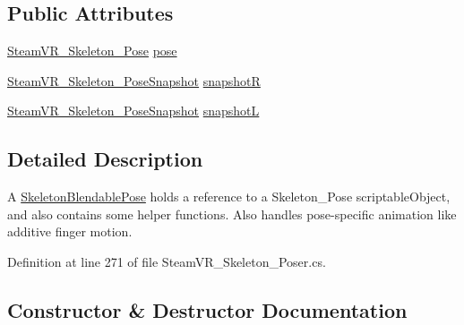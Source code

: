 \subsection*{Public Attributes}
\begin{DoxyCompactItemize}
\item 
\mbox{\hyperlink{class_valve_1_1_v_r_1_1_steam_v_r___skeleton___pose}{Steam\+V\+R\+\_\+\+Skeleton\+\_\+\+Pose}} \mbox{\hyperlink{class_valve_1_1_v_r_1_1_steam_v_r___skeleton___poser_1_1_skeleton_blendable_pose_afe000b0d0e4e73ed4d18eb3d9195e30b}{pose}}
\item 
\mbox{\hyperlink{class_valve_1_1_v_r_1_1_steam_v_r___skeleton___pose_snapshot}{Steam\+V\+R\+\_\+\+Skeleton\+\_\+\+Pose\+Snapshot}} \mbox{\hyperlink{class_valve_1_1_v_r_1_1_steam_v_r___skeleton___poser_1_1_skeleton_blendable_pose_af8bf7acca7e5db9fae2f57540bbd6df7}{snapshotR}}
\item 
\mbox{\hyperlink{class_valve_1_1_v_r_1_1_steam_v_r___skeleton___pose_snapshot}{Steam\+V\+R\+\_\+\+Skeleton\+\_\+\+Pose\+Snapshot}} \mbox{\hyperlink{class_valve_1_1_v_r_1_1_steam_v_r___skeleton___poser_1_1_skeleton_blendable_pose_aace0df11053b7fbd2c93115a64f2a7c6}{snapshotL}}
\end{DoxyCompactItemize}


\subsection{Detailed Description}
A \mbox{\hyperlink{class_valve_1_1_v_r_1_1_steam_v_r___skeleton___poser_1_1_skeleton_blendable_pose}{Skeleton\+Blendable\+Pose}} holds a reference to a Skeleton\+\_\+\+Pose scriptable\+Object, and also contains some helper functions. Also handles pose-\/specific animation like additive finger motion. 



Definition at line 271 of file Steam\+V\+R\+\_\+\+Skeleton\+\_\+\+Poser.\+cs.



\subsection{Constructor \& Destructor Documentation}
\mbox{\label{class_valve_1_1_v_r_1_1_steam_v_r___skeleton___poser_1_1_skeleton_blendable_pose_ad816078e7535d3fe519af66f3421e7ac}} 
